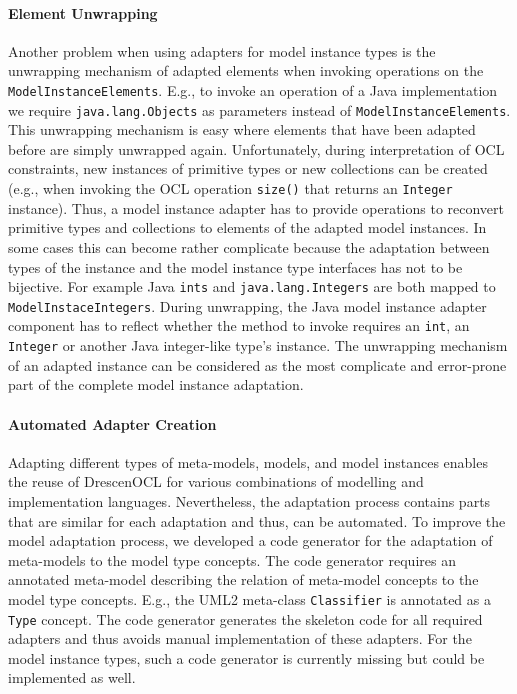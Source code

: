	\paragraph{Element Unwrapping}
	Another problem when using adapters for model instance types 
	is the unwrapping mechanism of adapted elements when invoking operations 
	on the \texttt{ModelInstanceElements}. E.g., to invoke an operation of a Java 
	implementation we require \texttt{java.lang.Objects} as parameters instead of 
	\texttt{ModelInstanceElements}. This unwrapping mechanism is easy 
	where elements that have been adapted before are simply unwrapped 
	again. Unfortunately, during interpretation of OCL constraints, 
	new instances of primitive types or new collections can be created 
	(e.g., when invoking the OCL operation \texttt{size()} that 
	returns an \texttt{Integer} instance). Thus, a 
	model instance adapter has to provide operations to reconvert 
	primitive types and collections to elements of the adapted model 
	instances. In some cases this can become rather complicate because 
	the adaptation between types of the instance and the model 
	instance type interfaces has not to be bijective. For 
	example Java \texttt{ints} and \texttt{java.lang.Integers} are 
	both mapped to \texttt{ModelInstaceIntegers}. During unwrapping, 
	the Java model instance adapter component has to reflect 
	whether the method to invoke requires an \texttt{int}, an 
	\texttt{Integer} or another Java integer-like type's instance.
	The unwrapping mechanism of an adapted instance 
	can be considered as the most complicate and error-prone part 
	of the complete model instance adaptation.

	\paragraph{Automated Adapter Creation}
	Adapting different types of meta-models, models, and model
	instances enables the reuse of DrescenOCL for various combinations
	of modelling and implementation languages.
	Nevertheless, the adaptation process contains parts that are similar 
	for each adaptation and thus, can be automated.
	To improve the model adaptation process, we developed a code generator 
	for the adaptation of meta-models to the model type concepts. The code 
	generator requires an annotated meta-model describing
	the relation of meta-model concepts to the model type concepts.
	E.g., the UML2 meta-class \texttt{Classifier} is annotated as a \texttt{Type} concept. 
	The code generator generates the skeleton code for all required 
	adapters and thus avoids manual implementation of these adapters. 
	For the model instance types, such a code generator is currently 
	missing but could be implemented as well.
	
